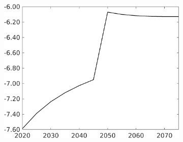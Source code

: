 \begin{figure}[h!!]
\begin{subfigure}{0.9\textwidth}
\begin{minipage}[]{0.45\textwidth}
			\includegraphics[width=1\textwidth]{../../codding_model/own_basedOnFried/optimalPol_010922_revision/figures/all_13Sept22/CompTaufPER_bytaul_Equlab_Reg0_tauf_spillover0_nsk0_xgr0_knspil0_sep0_LFlimit1_emsbase0_countec0_GovRev0_etaa0.79_lgd0.png} 
		\end{minipage}	
	\end{subfigure}
	

\end{figure}
